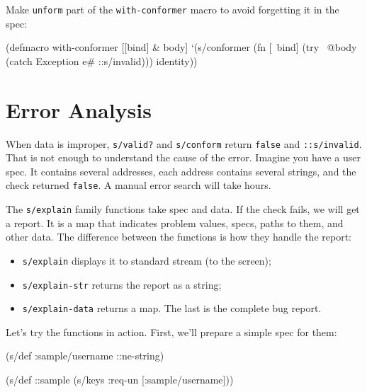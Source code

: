 Make \verb|unform| part of the \verb|with-conformer| macro to avoid forgetting it in the spec:

\begin{english}
  \begin{clojure}
(defmacro with-conformer
  [[bind] & body]
  `(s/conformer
    (fn [~bind]
      (try
        ~@body
        (catch Exception e#
          ::s/invalid)))
    identity))
  \end{clojure}
\end{english}

\section{Error Analysis}


\label{spec-explain}

When data is improper, \verb|s/valid?| and \verb|s/conform| return \verb|false| and \verb|::s/invalid|. That is not enough to understand the cause of the error. Imagine you have a user spec. It contains several addresses, each address contains several strings, and the check returned \verb|false|. A manual error search will take hours.

The \verb|s/explain| family functions take spec and data. If the check fails, we will get a report. It is a map that indicates problem values, specs, paths to them, and other data. The difference between the functions is how they handle the report:

\begin{itemize}


\item
  \verb|s/explain| displays it to standard stream (to the screen);

\item
  \verb|s/explain-str| returns the report as a string;

\item
  \verb|s/explain-data| returns a map. The last is the complete bug report.

\end{itemize}

Let's try the functions in action. First, we'll prepare a simple spec for them:

\begin{english}
  \begin{clojure}
(s/def :sample/username ::ne-string)

(s/def ::sample
  (s/keys :req-un [:sample/username]))
  \end{clojure}
\end{english}

